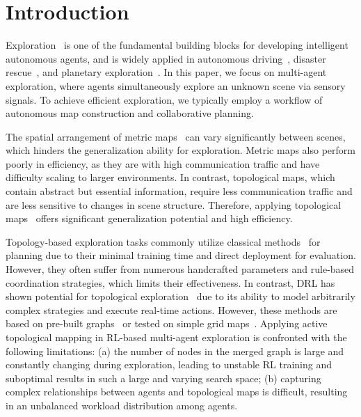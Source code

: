 
\section{Introduction}
\label{sec:intro}


Exploration~\cite{ramakrishnan2021exploration} is one of the fundamental building blocks for developing intelligent autonomous agents, and is widely applied in autonomous driving~\cite{autonomousdriving}, disaster rescue~\cite{rescue}, and planetary exploration~\cite{DBLP:journals/corr/abs-2002-00515}. 
In this paper, we focus on multi-agent exploration, where agents simultaneously explore an unknown scene via sensory signals. To achieve efficient exploration, we typically employ a workflow of autonomous map construction and collaborative planning. 

The spatial arrangement of metric maps~\cite{ans,singleagent-RL1} can vary significantly between scenes, which hinders the generalization ability for exploration. Metric maps also perform poorly in efficiency, as they are with high communication traffic and have difficulty scaling to larger environments. In contrast, topological maps, which contain abstract but essential information, require less communication traffic and are less sensitive to changes in scene structure. Therefore, applying topological maps~\cite{vgm,topo-map2} offers significant generalization potential and high efficiency.


Topology-based exploration tasks commonly utilize classical methods~\cite{normalized_frontier,zhang2022mr} for planning due to their minimal training time and direct deployment for evaluation. However, they often suffer from numerous handcrafted parameters and rule-based coordination strategies, which limits their effectiveness. In contrast, DRL has shown potential for topological exploration~\cite{topo_exploration, topo_multi2} due to its ability to model arbitrarily complex strategies and execute real-time actions. However, these methods are based on pre-built graphs~\cite{topo_exploration,topo-map4} or tested on simple grid maps~\cite{topo_multi2}. 
Applying active topological mapping in RL-based multi-agent exploration is confronted with the following limitations: (a) the number of nodes in the merged graph is large and constantly changing during exploration, leading to unstable RL training and suboptimal results in such a large and varying search space; (b) capturing complex relationships between agents and topological maps is difficult, resulting in an unbalanced workload distribution among agents.


